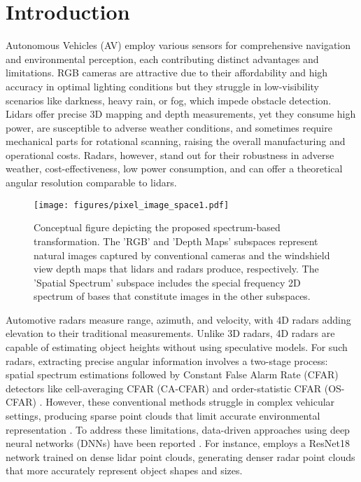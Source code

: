 \section{Introduction}

\par Autonomous Vehicles (AV) employ various sensors for comprehensive navigation and environmental perception, each contributing distinct advantages and limitations. RGB cameras are attractive due to their affordability and high accuracy in optimal lighting conditions but they struggle in low-visibility scenarios like darkness, heavy rain, or fog, which impede obstacle detection. Lidars offer precise 3D mapping and depth measurements, yet they consume high power, are susceptible to adverse weather conditions, and sometimes require mechanical parts for rotational scanning, raising the overall manufacturing and operational costs. Radars, however, stand out for their robustness in adverse weather, cost-effectiveness, low power consumption, and can offer a theoretical angular resolution comparable to lidars. 

\begin{figure}[t!]
  \centering
  \texttt{[image: figures/pixel\_image\_space1.pdf]}
  \caption{Conceptual figure depicting the proposed spectrum-based transformation. The 'RGB' and 'Depth Maps' subspaces represent natural images captured by conventional cameras and the windshield view depth maps that lidars and radars produce, respectively. The 'Spatial Spectrum' subspace includes the special frequency 2D spectrum of bases that constitute images in the other subspaces.}
  \label{fig: image space}
  \vspace{-22px} %
\end{figure}

\par Automotive radars measure range, azimuth, and velocity, with 4D radars adding elevation to their traditional measurements. Unlike 3D radars, 4D radars are capable of estimating object heights without using speculative models. For such radars, extracting precise angular information involves a two-stage process: spatial spectrum estimations followed by Constant False Alarm Rate (CFAR) detectors like cell-averaging CFAR (CA-CFAR) and order-statistic CFAR (OS-CFAR) \cite{richards2010principles}. However, these conventional methods struggle in complex vehicular settings, producing sparse point clouds that limit accurate environmental representation \cite{khan2022comprehensive}. To address these limitations, data-driven approaches using deep neural networks (DNNs) have been reported \cite{brodeski2019deep, cheng2022novel, roldan2024see}. For instance, \cite{roldan2024see} employs a ResNet18 network \cite{chen2017rethinking} trained on dense lidar point clouds, generating denser radar point clouds that more accurately represent object shapes and sizes.

